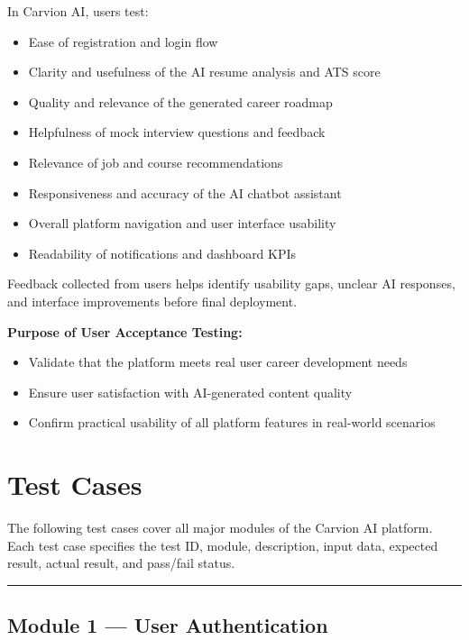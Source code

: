 \documentclass[12pt]{article}
\begin{document}
In Carvion AI, users test:

\begin{itemize}
  \item Ease of registration and login flow
  \item Clarity and usefulness of the AI resume analysis and ATS score
  \item Quality and relevance of the generated career roadmap
  \item Helpfulness of mock interview questions and feedback
  \item Relevance of job and course recommendations
  \item Responsiveness and accuracy of the AI chatbot assistant
  \item Overall platform navigation and user interface usability
  \item Readability of notifications and dashboard KPIs
\end{itemize}

Feedback collected from users helps identify usability gaps, unclear AI responses, and interface improvements before final deployment.

\textbf{Purpose of User Acceptance Testing:}

\begin{itemize}
  \item Validate that the platform meets real user career development needs
  \item Ensure user satisfaction with AI-generated content quality
  \item Confirm practical usability of all platform features in real-world scenarios
\end{itemize}

\clearpage
\section{Test Cases}

The following test cases cover all major modules of the Carvion AI platform. Each test case specifies the test ID, module, description, input data, expected result, actual result, and pass/fail status.

\noindent\rule{\textwidth}{0.4pt}

\subsection{Module 1 — User Authentication}
\end{document}
